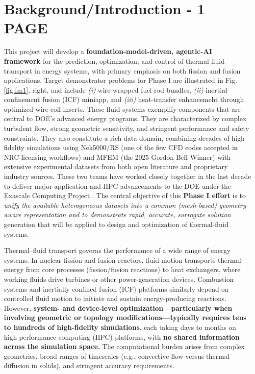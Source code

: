 \section{Background/Introduction  -   1 PAGE}

This project will develop a {\bf foundation-model-driven, agentic-AI framework}
\cite{Vinuesa2026XAI} for the prediction, optimization, and control of
thermal-fluid transport in energy systems, with primary emphasis on
both fission and fusion applications.
  Target demonstrator problems for Phase I are illustrated in Fig.
\ref{fig:fm1}, right, and include 
{\em (i)} wire-wrapped fuel-rod bundles, 
{\em (ii)} inertial-confinement fusion (ICF) miniapp, and 
{\em (iii)} heat-transfer enhancemeht through optimized wire-coil-inserts.
  These fluid systems exemplify components that are central to DOE’s advanced
energy programs.  
   They are characterized by complex turbulent flow, strong geometric sensitivity,
and stringent performance and safety constraints.
  They also constitute a rich data domain, combining decades of high-fidelity
simulations using Nek5000/RS (one of the few CFD codes accepted in NRC
licensing workflows) and MFEM (the 2025 Gordon Bell Winner) with extensive
experimental datasets from both open literature and proprietary industry sources.
  These two teams have worked closely together in the last decade to deliver major
application and HPC advancements to the DOE under the Exascale Computing Project \cite{ceed}.
   The central objective of this {\bf Phase I effort} is to 
{\em unify the available heterogeneous datasets into a common (mesh-based)
geometry-aware representation and to demonstrate rapid, accurate, surrogate solution}
generation that will be applied to design and optimization of thermal-fluid systems.

Thermal–fluid transport governs the performance of a wide range of energy systems.
In nuclear fission and fusion reactors, fluid motion transports thermal energy
from core processes (fission/fusion reactions) to heat exchangers, where working
fluids drive turbines or other power-generation devices. Combustion systems and
inertially confined fusion (ICF) platforms similarly depend on controlled fluid
motion to initiate and sustain energy-producing reactions.
However, {\bf system- and device-level optimization—particularly when involving
geometric or topology modifications—typically requires tens to hundreds of high-fidelity
simulations}, each taking days to months on high-performance computing (HPC) platforms,
with {\bf no shared information across the simulation space.}
The computational burden arises from complex geometries, broad ranges of timescales
(e.g., convective flow versus thermal diffusion in solids), and stringent
accuracy requirements.

